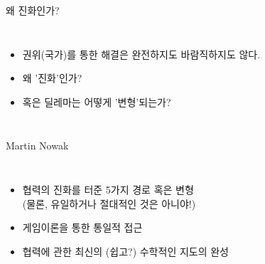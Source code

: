 \documentclass[final]{beamer}
\begin{document}
\begin{frame}[t]{왜 진화인가?}
	\begin{columns}[c]
		\column{13em}
		\column{18em}
		\begin{itemize}
			\item 권위(국가)를 통한 해결은 완전하지도 바람직하지도 않다. 
			\item 왜 '진화'인가? 
			\item 혹은 딜레마는 어떻게 '변형'되는가? 
		\end{itemize}
	\end{columns}
\end{frame}

\begin{frame}[t]{Martin Nowak}
	\begin{columns}[c]
		\column{20em}
		\begin{itemize}
			\item 협력의 진화를 터준 5가지 경로 혹은 변형\\(물론, 유일하거나 절대적인 것은 아니야!)
			\item 게임이론을 통한 통일적 접근 
			\item 협력에 관한 최신의 (쉽고?) 수학적인 지도의 완성
		\end{itemize}
		\column{12em}
	\end{columns}
\end{frame}
\end{document}
